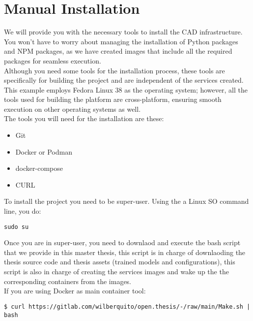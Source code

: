\section{Manual Installation}
\label{appendix:appendix_a}

We will provide you with the necessary tools to install the CAD infrastructure.
You won't have to worry about managing the installation of Python packages and NPM packages,
as we have created images that include all the required packages for seamless execution. \\

Although you need some tools for the installation process,
these tools are specifically for building the project and are independent of the services created. \\

This example employs Fedora Linux 38 as the operating system; however,
all the tools used for building the platform are cross-platform, ensuring smooth execution on other operating systems as well. \\

The tools you will need for the installation are these:

\begin{itemize}
  \item Git
  \item Docker or Podman
  \item docker-compose
  \item CURL
\end{itemize}

To install the project you need to be super-user.
Using the a Linux SO command line, you do:

\begin{Verbatim}[fontsize=\small]
sudo su
\end{Verbatim}

Once you are in super-user, you need to downlaod
and execute the bash script that we provide in this master thesis, this script is in
charge of downlaoding the thesis source code and thesis
assets (trained models and configurations), this script is also
in charge of creating the services images and wake up the
the corresponding containers from the images. \\

If you are using Docker as main container tool:

\begin{Verbatim}[fontsize=\small]
$ curl https://gitlab.com/wilberquito/open.thesis/-/raw/main/Make.sh | bash
\end{Verbatim}

